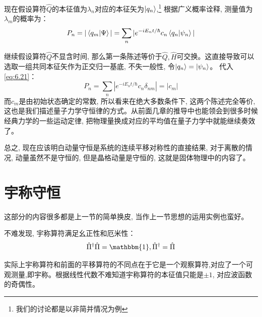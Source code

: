 \documentclass[a4paper,zihao=-4,linespread=1]{ctexrep}
\begin{document}
    现在假设算符$\hat{Q}$的本征值为$\lambda_n$对应的本征矢为$\ket{q_n}$,\footnote{我们的讨论都是以非简并情况为例} 根据广义概率诠释, 测量值为$\lambda_m$的概率为：
    \begin{equation}
        \label{eq:6.21}
        P_n=|\braket{q_m|\Psi}|=\sum_n|e^{-iE_nt/\hbar}c_n\braket{q_n|\psi_n}|
    \end{equation}

    继续假设算符$\hat{Q}$不显含时间, 那么第一条陈述等价于$\hat{Q},\hat{H}$可交换。这直接导致可以选取一组共同本征矢作为正交归一基底, 不失一般性, 令$\ket{q_n}=\ket{\psi_n}$。
    代入\ref{eq:6.21}：
    \begin{equation}
        P_n=\sum_n|e^{-iE_nt/\hbar}c_n\delta_{nm}|=|c_m|
    \end{equation}
    而$c_m$是由初始状态确定的常数, 所以看来在绝大多数条件下, 这两个陈述完全等价, 这也是我们描述量子力学守恒律的方式。从前面几章的推导中也能领会到很多时候经典力学的一些运动定律, 
    把物理量换成对应的平均值在量子力学中就能继续奏效了。

    总之, 现在应该明白动量守恒是系统的连续平移对称性的直接结果, 对于离散的情况, 动量虽然不是守恒的, 但是晶格动量是守恒的, 这就是固体物理中的内容了。
    
    \section{宇称守恒}
    这部分的内容很多都是上一节的简单换皮, 当作上一节思想的运用实例也蛮好。
    
    不难发现, 宇称算符满足幺正性和厄米性：
    \[\hat{\Pi}^\dagger\hat{\Pi}=\mathbbm{1},\hat{\Pi}^\dagger=\hat{\Pi}\]
    
    实际上宇称算符和前面的平移算符的不同点在于它是一个观察算符,对应了一个可观测量,即宇称。根据线性代数不难知道宇称算符的本征值只能是$\pm 1$, 对应波函数的奇偶性。
\end{document}
